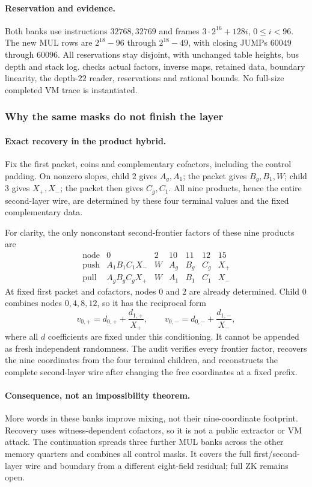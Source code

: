 \paragraph{Reservation and evidence.} Both banks use instructions $32768,32769$ and frames $3\cdot2^{16}+128i$, $0\le i<96$. The new MUL rows are $2^{18}-96$ through $2^{18}-49$, with closing JUMPs $60049$ through $60096$. All reservations stay disjoint, with unchanged table heights, bus depth and stack log.  checks actual factors, inverse maps, retained data, boundary linearity, the depth-$22$ reader, reservations and rational bounds. No full-size completed VM trace is instantiated.

\subsubsection{Why the same masks do not finish the layer}

\paragraph{Exact recovery in the product hybrid.} Fix the first packet, coins and complementary cofactors, including the control padding. On nonzero slopes, child $2$ gives $A_g,A_1$; the packet gives $B_g,B_1,W$; child $3$ gives $X_+,X_-$; the packet then gives $C_g,C_1$. All nine products, hence the entire second-layer wire, are determined by these four terminal values and the fixed complementary data.

For clarity, the only nonconstant second-frontier factors of these nine products are
\[
\begin{array}{c|rrrrrr}
 \text{node}&0&2&10&11&12&15\\\hline
 \text{push}&A_1B_1C_1X_-&W&A_g&B_g&C_g&X_+\\
 \text{pull}&A_gB_gC_gX_+&W&A_1&B_1&C_1&X_-
\end{array}
\]
At fixed first packet and cofactors, nodes $0$ and $2$ are already determined. Child $0$ combines nodes $0,4,8,12$, so it has the reciprocal form
\[
 v_{0,+}=d_{0,+}+\frac{d_{1,+}}{X_+},\qquad
 v_{0,-}=d_{0,-}+\frac{d_{1,-}}{X_-},
\]
where all $d$ coefficients are fixed under this conditioning. It cannot be appended as fresh independent randomness. The audit verifies every frontier factor, recovers the nine coordinates from the four terminal children, and reconstructs the complete second-layer wire after changing the free coordinates at a fixed prefix.

\paragraph{Consequence, not an impossibility theorem.} More words in these banks improve mixing, not their nine-coordinate footprint. Recovery uses witness-dependent cofactors, so it is not a public extractor or VM attack. The continuation  spreads three further MUL banks across the other memory quarters and combines all control masks. It covers the full first/second-layer wire and boundary from a different eight-field residual; full ZK remains open.
